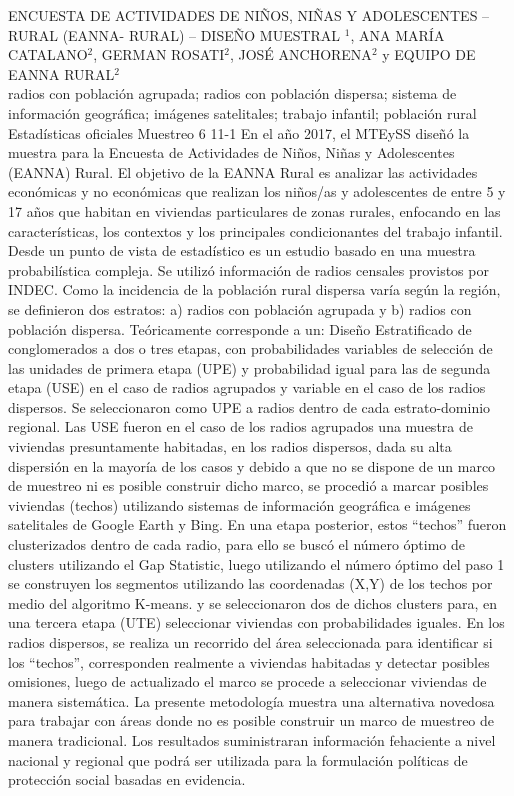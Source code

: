 \A
{ENCUESTA DE ACTIVIDADES DE NIÑOS, NIÑAS Y ADOLESCENTES – RURAL (EANNA- RURAL) – DISEÑO MUESTRAL}
{$^1$, ANA MARÍA CATALANO$^2$, GERMAN ROSATI$^2$, JOSÉ ANCHORENA$^2$ y EQUIPO DE EANNA RURAL$^2$}
{
\\}
{radios con población agrupada; radios con población dispersa; sistema de información geográfica; imágenes satelitales; trabajo infantil; población rural} 
 {Estadísticas oficiales} 
 {Muestreo} 
 {6} 
 {11-1}
{En el año 2017, el MTEySS diseñó la muestra para la Encuesta de Actividades de Niños, Niñas y Adolescentes (EANNA) Rural. El objetivo de la EANNA Rural es analizar las actividades económicas y no económicas que realizan los niños/as y adolescentes de entre 5 y 17 años que habitan en viviendas particulares de zonas rurales, enfocando en las características, los contextos y los principales condicionantes del trabajo infantil. Desde un punto de vista de estadístico es un estudio basado en una muestra probabilística compleja. Se utilizó información de radios censales provistos por INDEC. Como la incidencia de la población rural dispersa varía según la región, se definieron dos estratos: a) radios con población agrupada y b) radios con población dispersa. Teóricamente corresponde a un: Diseño Estratificado de conglomerados a dos o tres etapas, con probabilidades variables de selección de las unidades de primera etapa (UPE) y probabilidad igual para las de segunda etapa (USE) en el caso de radios agrupados y variable en el caso de los radios dispersos. Se seleccionaron como UPE a radios dentro de cada estrato-dominio regional. Las USE fueron en el caso de los radios agrupados una muestra de viviendas presuntamente habitadas, en los radios dispersos, dada su alta dispersión en la mayoría de los casos y debido a que no se dispone de un marco de muestreo ni es posible construir dicho marco, se procedió a marcar posibles viviendas (techos) utilizando sistemas de información geográfica e imágenes satelitales de Google Earth y Bing. En una etapa posterior, estos “techos” fueron clusterizados dentro de cada radio, para ello se buscó el número óptimo de clusters utilizando el Gap Statistic, luego utilizando el número óptimo del paso 1 se construyen los segmentos utilizando las coordenadas (X,Y) de los techos por medio del algoritmo K-means. y se seleccionaron dos de dichos clusters para, en una tercera etapa (UTE) seleccionar viviendas con probabilidades iguales. En los radios dispersos, se realiza un recorrido del área seleccionada para identificar si los “techos”, corresponden realmente a viviendas habitadas y detectar posibles omisiones, luego de actualizado el marco se procede a seleccionar viviendas de manera sistemática. La presente metodología muestra una alternativa novedosa para trabajar con áreas donde no es posible construir un marco de muestreo de manera tradicional. Los resultados suministraran información fehaciente a nivel nacional y regional que podrá ser utilizada para la formulación políticas de protección social basadas en evidencia.}
